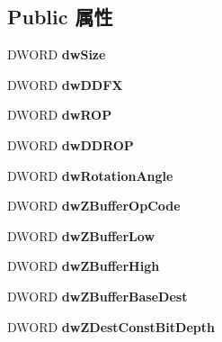 \subsection*{Public 属性}
\begin{DoxyCompactItemize}
\item 
\mbox{\label{struct___d_d_b_l_t_f_x_a479a5d1852d84f3a11d77fa12a5334a7}} 
D\+W\+O\+RD {\bfseries dw\+Size}
\item 
\mbox{\label{struct___d_d_b_l_t_f_x_aca5066a352d780ffe613cb22656d6445}} 
D\+W\+O\+RD {\bfseries dw\+D\+D\+FX}
\item 
\mbox{\label{struct___d_d_b_l_t_f_x_a9e605c69cbcba4372bfc3ecff47fd18a}} 
D\+W\+O\+RD {\bfseries dw\+R\+OP}
\item 
\mbox{\label{struct___d_d_b_l_t_f_x_ac32a9d81956c5a24155209998ff3b96d}} 
D\+W\+O\+RD {\bfseries dw\+D\+D\+R\+OP}
\item 
\mbox{\label{struct___d_d_b_l_t_f_x_a2010a2ea1dd36a68c917186131388245}} 
D\+W\+O\+RD {\bfseries dw\+Rotation\+Angle}
\item 
\mbox{\label{struct___d_d_b_l_t_f_x_a24879ecbd76ccc7cdc12f4110455cf64}} 
D\+W\+O\+RD {\bfseries dw\+Z\+Buffer\+Op\+Code}
\item 
\mbox{\label{struct___d_d_b_l_t_f_x_a3ee8ee9e9d3e0a70b839241d403c71b7}} 
D\+W\+O\+RD {\bfseries dw\+Z\+Buffer\+Low}
\item 
\mbox{\label{struct___d_d_b_l_t_f_x_a826adc1b24772781c742f30a97b5afe9}} 
D\+W\+O\+RD {\bfseries dw\+Z\+Buffer\+High}
\item 
\mbox{\label{struct___d_d_b_l_t_f_x_adbf7188be411f1248e398deac110bd46}} 
D\+W\+O\+RD {\bfseries dw\+Z\+Buffer\+Base\+Dest}
\item 
\mbox{\label{struct___d_d_b_l_t_f_x_a50880565d80d02aa8478cbbd415e3e17}} 
D\+W\+O\+RD {\bfseries dw\+Z\+Dest\+Const\+Bit\+Depth}
\item 

\end{DoxyCompactItemize}
